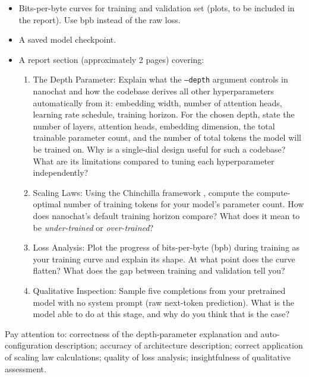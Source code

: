 \begin{itemize}
    \item Bits-per-byte curves for training and validation set  (plots, to be included in the report). Use bpb instead of the raw loss.
    \item A saved model checkpoint.
    \item A report section (approximately 2 pages) covering:
          \begin{enumerate}
              \item The Depth Parameter:  Explain what the \texttt{--depth} argument controls in nanochat and how the codebase derives all other hyperparameters automatically from it: embedding width, number of attention heads, learning rate schedule, training horizon. For the chosen depth, state the number of layers, attention heads, embedding dimension, the total trainable parameter count, and the number of total tokens the model will be trained on. Why is a single-dial design useful for such a codebase?  What are its limitations compared to tuning each hyperparameter independently?
              \item Scaling Laws:  Using the Chinchilla framework \citep{10.5555/3600270.3602446}, compute the compute-optimal number of training tokens for your model's parameter count. How does nanochat's default training horizon compare? What does it mean to be {\em under-trained} or {\em over-trained}?
              \item Loss Analysis:  Plot the progress of bits-per-byte (bpb) during training as your training curve and explain its shape. At what point does the curve flatten? What does the gap between training and validation tell you?
              \item Qualitative Inspection:  Sample five completions from your pretrained model with no system prompt (raw next-token prediction). What is the model able to do at this stage, and why do you think that is the case?
          \end{enumerate}
\end{itemize}
%
%
Pay attention to: correctness of the depth-parameter explanation and auto-configuration description; accuracy of architecture description; correct application of scaling law calculations; quality of loss analysis; insightfulness of qualitative assessment.

